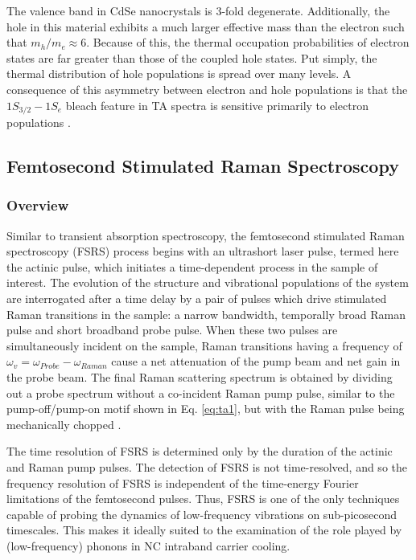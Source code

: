 The valence band in CdSe nanocrystals is 3-fold degenerate. Additionally, the hole in this material exhibits a much larger effective mass than the electron such that $m_h/m_e \approx 6$. Because of this, the thermal occupation probabilities of electron states are far greater than those of the coupled hole states. Put simply, the thermal distribution of hole populations is spread over many levels. A consequence of this asymmetry between electron and hole populations is that the $1S_{3/2}-1S_e$ bleach feature in TA spectra is sensitive primarily to electron populations \cite{doi:10.1021/jp9944132}. 

\subsection{Femtosecond Stimulated Raman Spectroscopy}
\subsubsection{Overview}
Similar to transient absorption spectroscopy, the femtosecond stimulated Raman spectroscopy (FSRS) process begins with an ultrashort laser pulse, termed here the actinic pulse, which initiates a time-dependent process in the sample of interest. The evolution of the structure and vibrational populations of the system are interrogated after a time delay by a pair of pulses which drive stimulated Raman transitions in the sample: a narrow bandwidth, temporally broad Raman pulse and short broadband probe pulse. When these two pulses are simultaneously incident on the sample, Raman transitions having a frequency of $\omega_v = \omega_{Probe} - \omega_{Raman}$ cause a net attenuation of the pump beam and net gain in the probe beam. The final Raman scattering spectrum is obtained by dividing out a probe spectrum without a co-incident Raman pump pulse, similar to the pump-off/pump-on motif shown in Eq. \ref{eq:ta1}, but with the Raman pulse being mechanically chopped \cite{doi:10.1146/annurev.physchem.58.032806.104456}. \par

The time resolution of FSRS is determined only by the duration of the actinic and Raman pump pulses. The detection of FSRS is not time-resolved, and so the frequency resolution of FSRS is independent of the time-energy Fourier limitations of the femtosecond pulses. Thus, FSRS is one of the only techniques capable of probing the dynamics of low-frequency vibrations on sub-picosecond timescales. This makes it ideally suited to the examination of the role played by (low-frequency) phonons in NC intraband carrier cooling.

